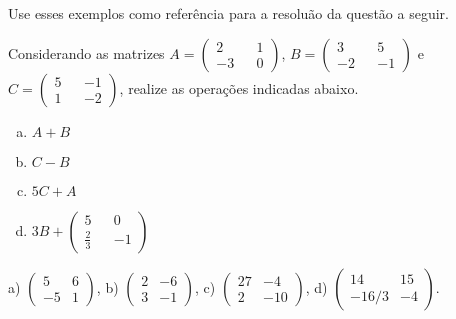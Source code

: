 \documentclass[main.tex]{subfiles}
\begin{document}
Use esses exemplos como referência para a resoluão da questão a seguir.

\begin{questao}
Considerando as matrizes $A=\begin{pmatrix} 2 && 1 \\ -3 && 0 \end{pmatrix}$, $B=\begin{pmatrix} 3 && 5 \\ -2 && -1 \end{pmatrix}$ e $C=\begin{pmatrix} 5 && -1 \\ 1 && -2 \end{pmatrix}$, realize as operações indicadas abaixo.
\begin{enumerate}[a)]
\item $A+B$
\item $C-B$
\item $5C+A$
\item $3B+\begin{pmatrix} 5 && 0 \\ \frac{2}{3} && -1 \end{pmatrix}$
\end{enumerate}
\end{questao}


\begin{gabarito}
	\begin{gabaritoQuestao}
		a) $\begin{pmatrix} 5 & 6 \\ -5 & 1\end{pmatrix}$, b) $\begin{pmatrix} 2 & -6 \\ 3 & -1\end{pmatrix}$, c) $\begin{pmatrix} 27 & -4 \\ 2 & -10\end{pmatrix}$, d) $\begin{pmatrix} 14 & 15 \\ -16/3 & -4\end{pmatrix}$.
	\end{gabaritoQuestao}
\end{gabarito}
\end{document}

